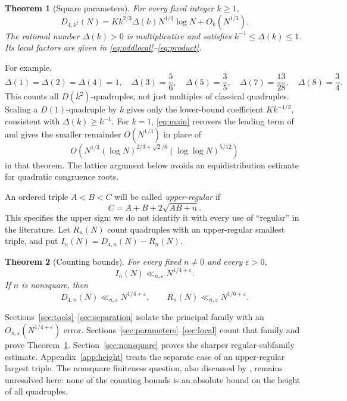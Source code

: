 \documentclass[11pt,a4paper]{article}
\numberwithin{equation}{section}
\newtheorem{theorem}{Theorem}[section]
\theoremstyle{remark}
\newcommand{\eps}{\varepsilon}
\begin{document}
\begin{theorem}[Square parameters]\label{thm:main}
For every fixed integer $k\ge1$,
\begin{equation}\label{eq:main}
D_{4,k^2}(N)=Kk^{2/3}\Delta(k)N^{1/3}\log N+O_k(N^{1/3}).
\end{equation}
The rational number $\Delta(k)>0$ is multiplicative and satisfies $k^{-1}\le\Delta(k)\le1$. Its local factors are given in \eqref{eq:oddlocal}--\eqref{eq:product}.
\end{theorem}
For example,
\[
\Delta(1)=\Delta(2)=\Delta(4)=1,\quad
\Delta(3)=\frac56,\quad\Delta(5)=\frac35,\quad
\Delta(7)=\frac{13}{28},\quad\Delta(8)=\frac34.
\]
This counts all $D(k^2)$-quadruples, not just multiples of classical quadruples. Scaling a $D(1)$-quadruple by $k$ gives only the lower-bound coefficient $Kk^{-1/3}$, consistent with $\Delta(k)\ge k^{-1}$. For $k=1$, \eqref{eq:main} recovers the leading term of \citet[Theorem 1.1]{MartinSitar} and gives the smaller remainder $O(N^{1/3})$ in place of
\[
O\!\left(N^{1/3}(\log N)^{2/3+\sqrt2/6}(\log\log N)^{5/12}\right)
\]
in that theorem. The lattice argument below avoids an equidistribution estimate for quadratic congruence roots.

An ordered triple $A<B<C$ will be called \emph{upper-regular} if
\begin{equation}\label{eq:upper}
C=A+B+2\sqrt{AB+n}.
\end{equation}
This specifies the upper sign; we do not identify it with every use of ``regular'' in the literature. Let $R_n(N)$ count quadruples with an upper-regular smallest triple, and put $I_n(N)=D_{4,n}(N)-R_n(N)$.

\begin{theorem}[Counting bounds]\label{thm:sparse}
For every fixed $n\ne0$ and every $\eps>0$,
\begin{equation}\label{eq:Ibound}
I_n(N)\ll_{n,\eps}N^{1/4+\eps}.
\end{equation}
If $n$ is nonsquare, then
\begin{equation}\label{eq:Dbound}
D_{4,n}(N)\ll_{n,\eps}N^{1/4+\eps},\qquad
R_n(N)\ll_{n,\eps}N^{1/6+\eps}.
\end{equation}
\end{theorem}

Sections~\ref{sec:tools}--\ref{sec:separation} isolate the principal family with an $O_{n,\eps}(N^{1/4+\eps})$ error. Sections~\ref{sec:parameters}--\ref{sec:local} count that family and prove Theorem~\ref{thm:main}. Section~\ref{sec:nonsquare} proves the sharper regular-subfamily estimate. Appendix~\ref{app:height} treats the separate case of an upper-regular largest triple. The nonsquare finiteness question, also discussed by \citet{DP2019}, remains unresolved here: none of the counting bounds is an absolute bound on the height of all quadruples.
\end{document}
